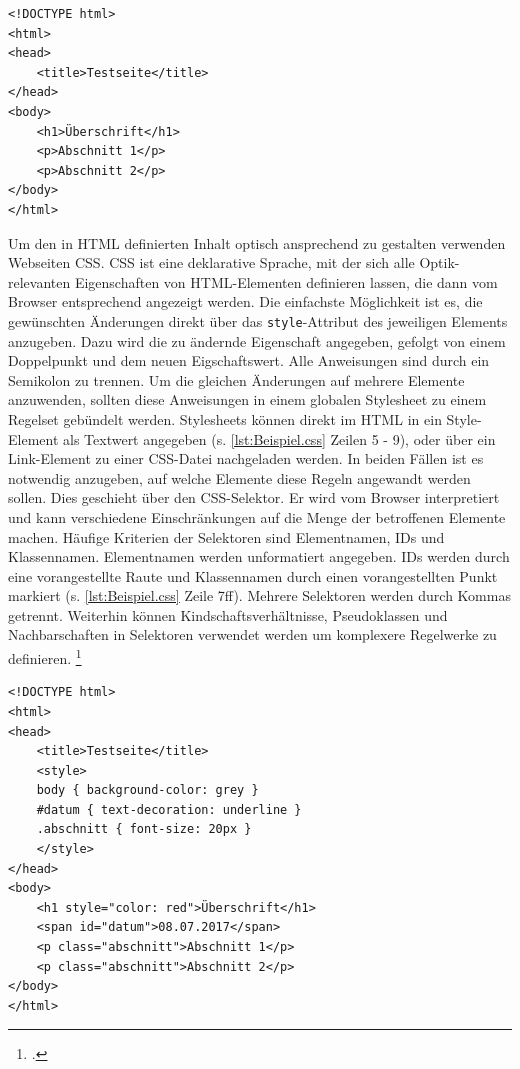 \begin{scriptsize}
\begin{lstlisting}
<!DOCTYPE html>
<html>
<head>
	<title>Testseite</title>
</head>
<body>
	<h1>Überschrift</h1>
	<p>Abschnitt 1</p>
	<p>Abschnitt 2</p>
</body>
</html>
\end{lstlisting}
\end{scriptsize}

Um den in \ac{HTML} definierten Inhalt optisch ansprechend zu gestalten verwenden Webseiten \ac{CSS}.
\ac{CSS} ist eine deklarative Sprache, mit der sich alle Optik-relevanten Eigenschaften von \ac{HTML}-Elementen definieren lassen, die dann vom Browser entsprechend angezeigt werden.
Die einfachste Möglichkeit ist es, die gewünschten Änderungen direkt über das \lstinline[style=eclipse]{style}-Attribut des jeweiligen Elements anzugeben.
Dazu wird die zu ändernde Eigenschaft angegeben, gefolgt von einem Doppelpunkt und dem neuen Eigschaftswert.
Alle Anweisungen sind durch ein Semikolon zu trennen.
Um die gleichen Änderungen auf mehrere Elemente anzuwenden, sollten diese Anweisungen in einem globalen Stylesheet zu einem Regelset gebündelt werden.
Stylesheets können direkt im \ac{HTML} in ein Style-Element als Textwert angegeben (s. \autoref{lst:Beispiel.css} Zeilen 5 - 9), oder über ein Link-Element zu einer \ac{CSS}-Datei nachgeladen werden.
In beiden Fällen ist es notwendig anzugeben, auf welche Elemente diese Regeln angewandt werden sollen.
Dies geschieht über den \ac{CSS}-Selektor.
Er wird vom Browser interpretiert und kann verschiedene Einschränkungen auf die Menge der betroffenen Elemente machen.
Häufige Kriterien der Selektoren sind Elementnamen, IDs und Klassennamen.
Elementnamen werden unformatiert angegeben. IDs werden durch eine vorangestellte Raute und Klassennamen durch einen vorangestellten Punkt markiert (s. \autoref{lst:Beispiel.css} Zeile 7ff).
Mehrere Selektoren werden durch Kommas getrennt.
Weiterhin können Kindschaftsverhältnisse, Pseudoklassen und Nachbarschaften in Selektoren verwendet werden um komplexere Regelwerke zu definieren.
\footcite[Vgl.][125\psq]{webTechnologies}

\begin{scriptsize}
\begin{lstlisting}
<!DOCTYPE html>
<html>
<head>
	<title>Testseite</title>
	<style>
	body { background-color: grey }
	#datum { text-decoration: underline }
	.abschnitt { font-size: 20px }
	</style>
</head>
<body>
	<h1 style="color: red">Überschrift</h1>
	<span id="datum">08.07.2017</span>
	<p class="abschnitt">Abschnitt 1</p>
	<p class="abschnitt">Abschnitt 2</p>
</body>
</html>
\end{lstlisting}
\end{scriptsize}

